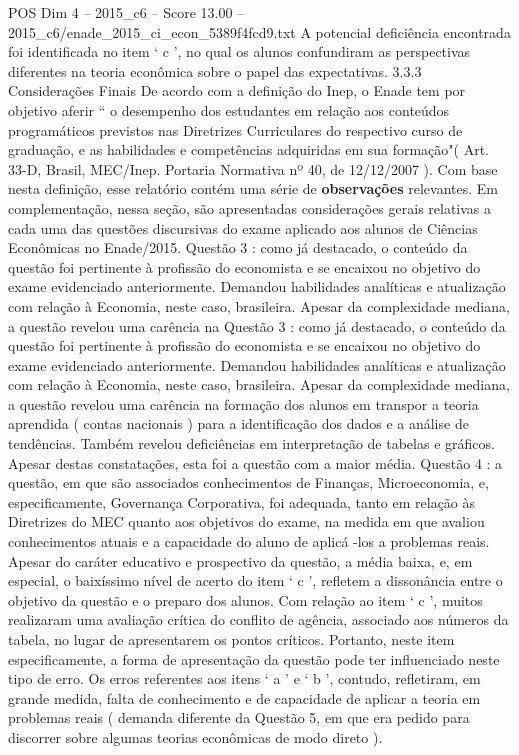 \begin{textsample}{POS Dim 4 – 2015\_c6 – Score 13.00 – 2015\_c6/enade\_2015\_ci\_econ\_5389f4fcd9.txt}
A potencial deficiência encontrada foi identificada no item ‘ c ’, no qual os alunos confundiram as perspectivas diferentes na teoria econômica sobre o papel das expectativas. 3.3.3 Considerações Finais De acordo com a definição do Inep, o Enade tem por objetivo aferir “ o desempenho dos estudantes em relação aos conteúdos programáticos previstos nas Diretrizes Curriculares do respectivo curso de graduação, e as habilidades e competências adquiridas em sua formação"( Art. 33-D, Brasil, MEC/Inep.
Portaria Normativa nº 40, de 12/12/2007 ).
Com base nesta definição, esse relatório contém uma série de \textbf{observações} relevantes.
Em complementação, nessa seção, são apresentadas considerações gerais relativas a cada uma das questões discursivas do exame aplicado aos alunos de Ciências Econômicas no Enade/2015.
Questão 3 : como já destacado, o conteúdo da questão foi pertinente à profissão do economista e se encaixou no objetivo do exame evidenciado anteriormente.
Demandou habilidades analíticas e atualização com relação à Economia, neste caso, brasileira.
Apesar da complexidade mediana, a questão revelou uma carência na Questão 3 : como já destacado, o conteúdo da questão foi pertinente à profissão do economista e se encaixou no objetivo do exame evidenciado anteriormente.
Demandou habilidades analíticas e atualização com relação à Economia, neste caso, brasileira.
Apesar da complexidade mediana, a questão revelou uma carência na formação dos alunos em transpor a teoria aprendida ( contas nacionais ) para a identificação dos dados e a análise de tendências.
Também revelou deficiências em interpretação de tabelas e gráficos.
Apesar destas constatações, esta foi a questão com a maior média.
Questão 4 : a questão, em que são associados conhecimentos de Finanças, Microeconomia, e, especificamente, Governança Corporativa, foi adequada, tanto em relação às Diretrizes do MEC quanto aos objetivos do exame, na medida em que avaliou conhecimentos atuais e a capacidade do aluno de aplicá -los a problemas reais.
Apesar do caráter educativo e prospectivo da questão, a média baixa, e, em especial, o baixíssimo nível de acerto do item ‘ c ’, refletem a dissonância entre o objetivo da questão e o preparo dos alunos.
Com relação ao item ‘ c ’, muitos realizaram uma avaliação crítica do conflito de agência, associado aos números da tabela, no lugar de apresentarem os pontos críticos.
Portanto, neste item especificamente, a forma de apresentação da questão pode ter influenciado neste tipo de erro.
Os erros referentes aos itens ‘ a ’ e ‘ b ’, contudo, refletiram, em grande medida, falta de conhecimento e de capacidade de aplicar a teoria em problemas reais ( demanda diferente da Questão 5, em que era pedido para discorrer sobre algumas teorias econômicas de modo direto ).

\end{textsample}
